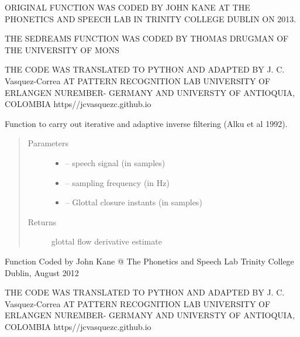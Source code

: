 \documentclass[letterpaper,10pt,english]{sphinxmanual}
\begin{document}
\begin{fulllineitems}
\begin{description}
\end{description}

ORIGINAL FUNCTION WAS CODED BY JOHN KANE AT THE PHONETICS AND SPEECH LAB IN 
TRINITY COLLEGE DUBLIN ON 2013.

THE SEDREAMS FUNCTION WAS CODED BY THOMAS DRUGMAN OF THE UNIVERSITY OF MONS

THE CODE WAS TRANSLATED TO PYTHON AND ADAPTED BY J. C. Vasquez-Correa
AT PATTERN RECOGNITION LAB UNIVERSITY OF ERLANGEN NUREMBER- GERMANY
AND UNIVERSTY OF ANTIOQUIA, COLOMBIA
https//jcvasquezc.github.io

\end{fulllineitems}


\begin{fulllineitems}
\label{\detokenize{Glottal:glottal.IAIF}}
Function to carry out iterative and adaptive inverse filtering (Alku et al 1992).
\begin{quote}\begin{description}
\item[{Parameters}] \leavevmode\begin{itemize}
\item {} 
 -- speech signal (in samples)

\item {} 
 -- sampling frequency (in Hz)

\item {} 
 -- Glottal closure instants (in samples)

\end{itemize}

\item[{Returns}] \leavevmode
glottal flow derivative estimate

\end{description}\end{quote}

Function Coded by John Kane @ The Phonetics and Speech Lab
Trinity College Dublin, August 2012

THE CODE WAS TRANSLATED TO PYTHON AND ADAPTED BY J. C. Vasquez-Correa
AT PATTERN RECOGNITION LAB UNIVERSITY OF ERLANGEN NUREMBER- GERMANY
AND UNIVERSTY OF ANTIOQUIA, COLOMBIA
https//jcvasquezc.github.io

\end{fulllineitems}
\end{document}
